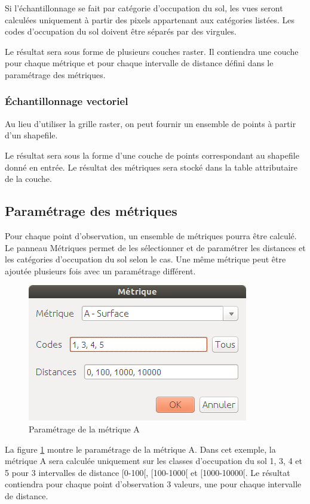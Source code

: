 \documentclass{report}
\begin{document}
Si l'échantillonnage se fait par catégorie d'occupation du sol, les vues seront calculées uniquement à partir des pixels appartenant aux catégories listées. Les codes d'occupation du sol doivent être séparés par des virgules.

Le résultat sera sous forme de plusieurs couches raster. Il contiendra une couche pour chaque métrique et pour chaque intervalle de distance défini dans le paramétrage des métriques.

\subsubsection{Échantillonnage vectoriel}
Au lieu d'utiliser la grille raster, on peut fournir un ensemble de points à partir d'un shapefile.

Le résultat sera sous la forme d'une couche de points correspondant au shapefile donné en entrée. Le résultat des métriques sera stocké dans la table attributaire de la couche.


\subsection{Paramétrage des métriques}
\label{param_metrics}
Pour chaque point d'observation, un ensemble de métriques pourra être calculé. Le panneau Métriques permet de les sélectionner et de paramétrer les distances et les catégories d'occupation du sol selon le cas. Une même métrique peut être ajoutée plusieurs fois avec un paramétrage différent.

\begin{figure}[H]
	\includegraphics[scale=0.5]{img/metric_param-fr.png} 
	\caption{Paramétrage de la métrique A}
	\label{metric_param_dlg}
\end{figure}

La figure \ref{metric_param_dlg} montre le paramétrage de la métrique A. Dans cet exemple, la métrique A sera calculée uniquement sur les classes d'occupation du sol 1, 3, 4 et 5 pour 3 intervalles de distance [0-100[, [100-1000[ et [1000-10000[. Le résultat contiendra pour chaque point d'observation 3 valeurs, une pour chaque intervalle de distance.
\end{document}
